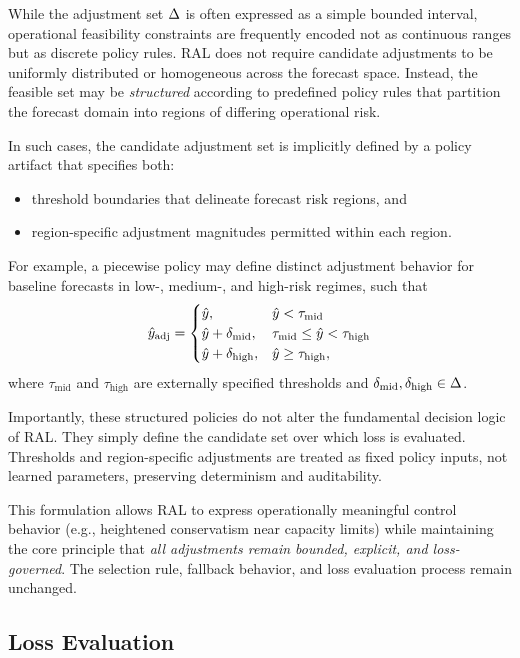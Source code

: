While the adjustment set \(\Delta\) is often expressed as a simple bounded
interval, operational feasibility constraints are frequently encoded not as
continuous ranges but as discrete policy rules. RAL does not require candidate
adjustments to be uniformly distributed or homogeneous across the forecast space.
Instead, the feasible set may be \emph{structured} according to predefined policy
rules that partition the forecast domain into regions of differing operational
risk.

In such cases, the candidate adjustment set is implicitly defined by a policy
artifact that specifies both:
\begin{itemize}[leftmargin=*]
    \item threshold boundaries that delineate forecast risk regions, and
    \item region-specific adjustment magnitudes permitted within each region.
\end{itemize}

For example, a piecewise policy may define distinct adjustment behavior for
baseline forecasts in low-, medium-, and high-risk regimes, such that
\[
\hat{y}_{\text{adj}}
=
\begin{cases}
\hat{y}, & \hat{y} < \tau_{\text{mid}} \\
\hat{y} + \delta_{\text{mid}}, & \tau_{\text{mid}} \le \hat{y} < \tau_{\text{high}} \\
\hat{y} + \delta_{\text{high}}, & \hat{y} \ge \tau_{\text{high}},
\end{cases}
\]
where \(\tau_{\text{mid}}\) and \(\tau_{\text{high}}\) are externally specified
thresholds and \(\delta_{\text{mid}}, \delta_{\text{high}} \in \Delta\).

Importantly, these structured policies do not alter the fundamental decision
logic of RAL. They simply define the candidate set over which loss is evaluated.
Thresholds and region-specific adjustments are treated as fixed policy inputs,
not learned parameters, preserving determinism and auditability.

This formulation allows RAL to express operationally meaningful control behavior
(e.g., heightened conservatism near capacity limits) while maintaining the core
principle that \emph{all adjustments remain bounded, explicit, and loss-governed}.
The selection rule, fallback behavior, and loss evaluation process remain
unchanged.

\subsection{Loss Evaluation}

